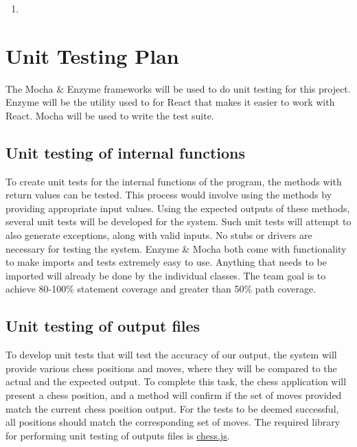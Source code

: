 \documentclass[12pt, titlepage]{article}
\begin{document}
\begin{enumerate}
    \item 
\end{enumerate}

\section{Unit Testing Plan}
		
    The Mocha \& Enzyme frameworks will be used to do unit testing for this project. Enzyme will be the utility used to for React that makes it easier to work with React. Mocha will be used to write the test suite.

\subsection{Unit testing of internal functions}

	To create unit tests for the internal functions of the program, the methods with return values can be tested. This process would involve using the methods by providing appropriate input values. Using the expected outputs of these methods, several unit tests will be developed for the system. Such unit tests will attempt to also generate exceptions, along with valid inputs. No stubs or drivers are necessary for testing the system. Enzyme \& Mocha both come with functionality to make imports and tests extremely easy to use. Anything that needs to be imported will already be done by the individual classes. The team goal is to achieve 80-100\% statement coverage and greater than 50\% path coverage.
	
\subsection{Unit testing of output files}		

	To develop unit tests that will test the accuracy of our output, the system will provide various chess positions and moves, where they will be compared to the actual and the expected output. To complete this task, the chess application will present a chess position, and a method will confirm if the set of moves provided match the current chess position output. For the tests to be deemed successful, all positions should match the corresponding set of moves. The required library for performing unit testing of outputs files is \href{https://www.npmjs.com/package/chess.js}{chess.js}.


\end{document}
